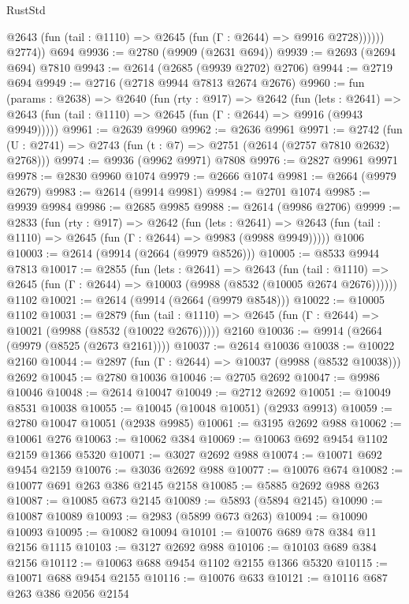 \begin{lexlean}{RustStd}
\begin{coremodule}
              @2643 (fun (tail : @1110) => @2645 (fun (Γ : @2644) => @9916 @2728))))))
        @2774))
    @694
@9936 := @2780 (@9909 (@2631 @694))
@9939 := @2693 (@2694 @694) @7810
@9943 := @2614 (@2685 (@9939 @2702) @2706)
@9944 := @2719 @694
@9949 := @2716 (@2718 @9944 @7813 @2674 @2676)
@9960 := fun (params : @2638) =>
  @2640
    (fun (rty : @917) =>
    @2642
      (fun (lets : @2641) =>
      @2643 (fun (tail : @1110) => @2645 (fun (Γ : @2644) => @9916 (@9943 @9949)))))
@9961 := @2639 @9960
@9962 := @2636 @9961
@9971 := @2742 (fun (U : @2741) => @2743 (fun (t : @7) => @2751 (@2614 (@2757 @7810 @2632) @2768)))
@9974 := @9936 (@9962 @9971) @7808
@9976 := @2827 @9961 @9971
@9978 := @2830 @9960 @1074
@9979 := @2666 @1074
@9981 := @2664 (@9979 @2679)
@9983 := @2614 (@9914 @9981)
@9984 := @2701 @1074
@9985 := @9939 @9984
@9986 := @2685 @9985
@9988 := @2614 (@9986 @2706)
@9999 := @2833
    (fun (rty : @917) =>
    @2642
      (fun (lets : @2641) =>
      @2643 (fun (tail : @1110) => @2645 (fun (Γ : @2644) => @9983 (@9988 @9949)))))
    @1006
@10003 := @2614 (@9914 (@2664 (@9979 @8526)))
@10005 := @8533 @9944 @7813
@10017 := @2855
    (fun (lets : @2641) =>
    @2643
      (fun (tail : @1110) =>
      @2645 (fun (Γ : @2644) => @10003 (@9988 (@8532 (@10005 @2674 @2676))))))
    @1102
@10021 := @2614 (@9914 (@2664 (@9979 @8548)))
@10022 := @10005 @1102
@10031 := @2879
    (fun (tail : @1110) => @2645 (fun (Γ : @2644) => @10021 (@9988 (@8532 (@10022 @2676)))))
    @2160
@10036 := @9914 (@2664 (@9979 (@8525 (@2673 @2161))))
@10037 := @2614 @10036
@10038 := @10022 @2160
@10044 := @2897 (fun (Γ : @2644) => @10037 (@9988 (@8532 @10038))) @2692
@10045 := @2780 @10036
@10046 := @2705 @2692
@10047 := @9986 @10046
@10048 := @2614 @10047
@10049 := @2712 @2692
@10051 := @10049 @8531 @10038
@10055 := @10045 (@10048 @10051) (@2933 @9913)
@10059 := @2780 @10047 @10051 (@2938 @9985)
@10061 := @3195 @2692 @988
@10062 := @10061 @276
@10063 := @10062 @384
@10069 := @10063 @692 @9454 @1102 @2159 @1366 @5320
@10071 := @3027 @2692 @988
@10074 := @10071 @692 @9454 @2159
@10076 := @3036 @2692 @988
@10077 := @10076 @674
@10082 := @10077 @691 @263 @386 @2145 @2158
@10085 := @5885 @2692 @988 @263
@10087 := @10085 @673 @2145
@10089 := @5893 (@5894 @2145)
@10090 := @10087 @10089
@10093 := @2983 (@5899 @673 @263)
@10094 := @10090 @10093
@10095 := @10082 @10094
@10101 := @10076 @689 @78 @384 @11 @2156 @1115
@10103 := @3127 @2692 @988
@10106 := @10103 @689 @384 @2156
@10112 := @10063 @688 @9454 @1102 @2155 @1366 @5320
@10115 := @10071 @688 @9454 @2155
@10116 := @10076 @633
@10121 := @10116 @687 @263 @386 @2056 @2154

\end{coremodule}
\end{lexlean}
